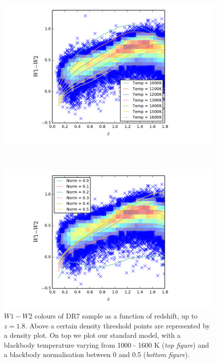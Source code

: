 \begin{figure}
  \centering
  \begin{minipage}[b]{0.75\textwidth} 
    \includegraphics[width=\textwidth]{figures/chapter06/w1w2_bbt}
  \end{minipage} \\
  \begin{minipage}[b]{0.75\textwidth} 
    \includegraphics[width=\textwidth]{figures/chapter06/w1w2_bbflxnrm}
  \end{minipage}
  \caption{$W1 - W2$ colours of DR7 sample as a function of redshift, up to $z=1.8$. Above a certain density threshold points are represented by a density plot. On top we plot our standard model, with a blackbody temperature varying from 1000 - 1600 K ({\it top figure}) and a blackbody normalisation between 0 and 0.5 ({\it bottom figure}).}
  \label{fig:w1w2colors}
\end{figure}

